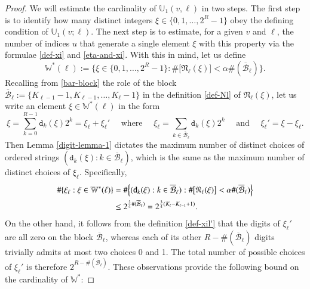 \documentclass[12pt, twoside]{article}
\theoremstyle{definition}
\numberwithin{equation}{section}
\begin{document}
\begin{proof} 
We will estimate the cardinality of $\mathbb U_1(v, \ell)$ in two steps. The first step is to identify how many distinct integers $\xi \in \{0, 1, \ldots, 2^R - 1\}$ obey the defining condition of $\mathbb U_1(v; \ell)$. The next step is to estimate, for a given $v$ and $\ell$, the number of indices $u$ that generate a single element $\xi$ with this property via the formulae \eqref{def-xi} and \eqref{eta-and-xi}. With this in mind, let us define 
\[ \mathbb W^{\ast}(\ell) := \bigl\{ \xi \in \{0, 1, \ldots, 2^{R}-1\} : \# \bigl[ \mathfrak N_{\ell}(\xi) \bigr] < \alpha \#(\overline{\mathcal B}_{\ell}) \bigr\}. \] 
Recalling from \eqref{bar-block} the role of the block $\overline{\mathcal B}_{\ell} := \{K_{\ell-1}-1, K_{\ell-1}, \ldots, K_{\ell}-1 \}$ in the definition \eqref{def-Nl} of $\mathfrak N_{\ell}(\xi)$, let us write an element $\xi \in \mathbb W^{\ast}(\ell)$ in the form
\begin{equation} \label{def-xil'} \xi = \sum_{k=0}^{R-1} \mathtt d_k(\xi) 2^k = \xi_{\ell} + \xi_{\ell}' \quad \text{ where } \quad \xi_{\ell}  = \sum_{k \in \overline{\mathcal B}_{\ell}} \mathtt d_k(\xi) 2^k \quad \text{ and } \quad \xi_{\ell}' = \xi - \xi_{\ell}. 
\end{equation} 
Then Lemma \ref{digit-lemma-1} dictates the maximum number of distinct choices of ordered strings $(\mathtt d_k(\xi) : k \in \overline{\mathcal B}_{\ell} )$, which is the same as the maximum number of distinct choices of $\xi_{\ell}$. Specifically, 
\begin{align*} 
\#\{\xi_{\ell} : \xi \in \mathbb W^{\ast}(\ell) \} &= \#\Bigl\{(\mathtt d_k(\xi): k \in \overline{\mathcal B}_{\ell}) :  \# \bigl[ \mathfrak N_{\ell}(\xi) \bigr] < \alpha \#(\overline{\mathcal B}_{\ell})   \Bigr\} \\ 
&\leq 2^{\frac{3}{4} \#(\overline{\mathcal B}_{\ell})} = 2^{\frac{3}{4}(K_{\ell} - K_{\ell-1}+1)}. \end{align*}  
On the other hand, it follows from the definition \eqref{def-xil'} that the digits of $\xi_{\ell}'$ are all zero on the block $\overline{\mathcal{B}}_{\ell}$, whereas each of its other $R - \#(\overline{\mathcal B}_{\ell})$ digits trivially admits at most two choices 0 and 1. The total number of possible choices of $\xi_{\ell}'$ is therefore $2^{R - \#(\overline{\mathcal B}_{\ell})}$. These observations provide the following bound on the cardinality of $\mathbb W^{\ast}$:  

\end{proof}
\end{document}
